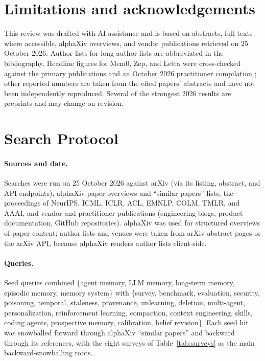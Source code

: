 \documentclass[11pt]{article}
\begin{document}
\section*{Limitations and acknowledgements}

This review was drafted with AI assistance and is based on abstracts, full texts where accessible, alphaXiv overviews, and vendor publications retrieved on 25 October 2026. Author lists for long author lists are abbreviated in the bibliography. Headline figures for Mem0, Zep, and Letta were cross-checked against the primary publications and an October 2026 practitioner compilation \citep{kumar2026agentmemory}; other reported numbers are taken from the cited papers' abstracts and have not been independently reproduced. Several of the strongest 2026 results are preprints and may change on revision.



\appendix

\section{Search Protocol}
\label{app:method}

\paragraph{Sources and date.} Searches were run on 25 October 2026 against arXiv (via its listing, abstract, and API endpoints), alphaXiv paper overviews and ``similar papers'' lists, the proceedings of NeurIPS, ICML, ICLR, ACL, EMNLP, COLM, TMLR, and AAAI, and vendor and practitioner publications (engineering blogs, product documentation, GitHub repositories). alphaXiv was used for structured overviews of paper content; author lists and venues were taken from arXiv abstract pages or the arXiv API, because alphaXiv renders author lists client-side.

\paragraph{Queries.} Seed queries combined \{agent memory, LLM memory, long-term memory, episodic memory, memory system\} with \{survey, benchmark, evaluation, security, poisoning, temporal, staleness, provenance, unlearning, deletion, multi-agent, personalization, reinforcement learning, compaction, context engineering, skills, coding agents, prospective memory, calibration, belief revision\}. Each seed hit was snowballed forward through alphaXiv ``similar papers'' and backward through its references, with the eight surveys of Table~\ref{tab:surveys} as the main backward-snowballing roots.
\end{document}
